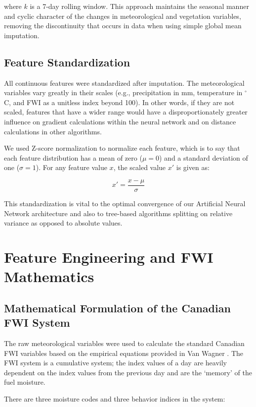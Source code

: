\documentclass[journal, 10pt, twocolumn]{IEEEtran}
\begin{document}
where $k$ is a 7-day rolling window. This approach maintains the seasonal manner and cyclic character of the changes in meteorological and vegetation variables, removing the discontinuity that occurs in data when using simple global mean imputation.

\subsection{Feature Standardization}
All continuous features were standardized after imputation. The meteorological variables vary greatly in their scales (e.g., precipitation in mm, temperature in $^\circ$C, and FWI as a unitless index beyond 100). In other words, if they are not scaled, features that have a wider range would have a disproportionately greater influence on gradient calculations within the neural network and on distance calculations in other algorithms.

We used Z-score normalization to normalize each feature, which is to say that each feature distribution has a mean of zero ($\mu = 0$) and a standard deviation of one ($\sigma = 1$). For any feature value $x$, the scaled value $x'$ is given as:

\begin{equation}
x' = \frac{x - \mu}{\sigma}
\end{equation}

This standardization is vital to the optimal convergence of our Artificial Neural Network architecture and also to tree-based algorithms splitting on relative variance as opposed to absolute values.

\section{Feature Engineering and FWI Mathematics}

\subsection{Mathematical Formulation of the Canadian FWI System}
The raw meteorological variables were used to calculate the standard Canadian FWI variables based on the empirical equations provided in Van Wagner \cite{b8}. The FWI system is a cumulative system; the index values of a day are heavily dependent on the index values from the previous day and are the `memory' of the fuel moisture.

There are three moisture codes and three behavior indices in the system:
\end{document}
